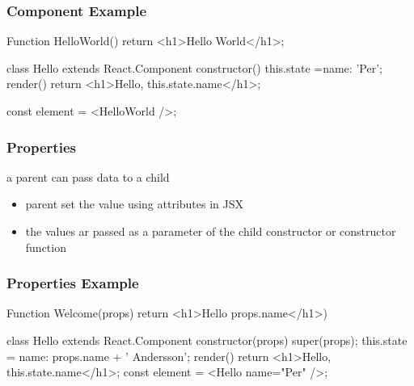 \begin{frame}[fragile] \frametitle{Component Example}
\begin{CodeBox}{}
Function HelloWorld() {
 return <h1>Hello World</h1>;
}

class Hello extends React.Component {
  constructor() {
    this.state ={name: 'Per'};
  }
  render() {
    return <h1>Hello, {this.state.name}</h1>;
  }
}

const element = <HelloWorld />;
\end{CodeBox}
\end{frame}

\begin{frame}[fragile] \frametitle{Properties}
a parent can pass data to a child
\begin{itemize}
  \item parent set the value using attributes in JSX
  \item the values ar passed as a  parameter of the child constructor or constructor function
\end{itemize}
\end{frame}

\begin{frame}[fragile] \frametitle{Properties Example}
\begin{CodeBox}{}
Function Welcome(props) {
  return <h1>Hello {props.name}</h1>)
}

class Hello extends React.Component {
  constructor(props) {
    super(props);
    this.state = {name: props.name + ' Andersson'};
  }
  render() {
    return <h1>Hello, {this.state.name}</h1>;
  }
}
const element = <Hello name="Per" />;
\end{CodeBox}
\end{frame}

